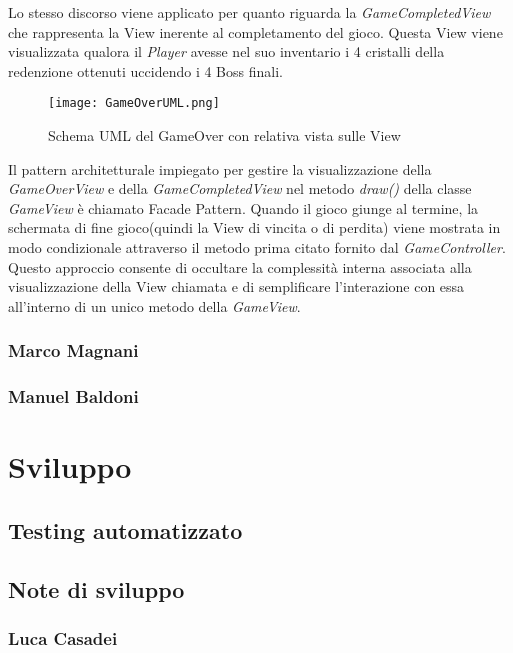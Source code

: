 \documentclass[a4paper,12pt]{report}
\begin{document}
Lo stesso discorso viene applicato per quanto riguarda la \textit{GameCompletedView} che rappresenta la View inerente al completamento del gioco. Questa View viene visualizzata qualora il \textit{Player} avesse nel suo inventario i 4 cristalli della redenzione ottenuti uccidendo i 4 Boss finali.

\begin{figure}[H]
	\centering
	\texttt{[image: GameOverUML.png]}
	\caption{Schema UML del GameOver con relativa vista sulle View}
	\label{fig:diagramma-classe-GameOver}
\end{figure}

Il pattern architetturale impiegato per gestire la visualizzazione della \textit{GameOverView} e della \textit{GameCompletedView} nel metodo \textit{draw()} della classe \textit{GameView} è chiamato Facade Pattern.
Quando il gioco giunge al termine, la schermata di fine gioco(quindi la View di vincita o di perdita) viene mostrata in modo condizionale attraverso il metodo prima citato fornito dal \textit{GameController}. Questo approccio consente di occultare la complessità interna associata alla visualizzazione della View chiamata e di semplificare l'interazione con essa all'interno di un unico metodo della \textit{GameView}.

\subsection*{Marco Magnani}

\subsection*{Manuel Baldoni}


\chapter{Sviluppo}

\section{Testing automatizzato}
\section{Note di sviluppo}

\subsection*{Luca Casadei}
\end{document}
